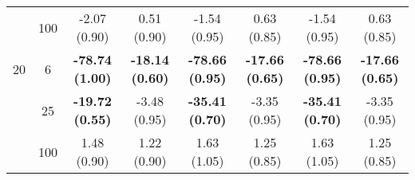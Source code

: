 \documentclass[
  man]{apa6}
\newenvironment{lltable}{\begin{landscape}\centering\begin{ThreePartTable}}{\end{ThreePartTable}\end{landscape}}
\begin{document}
\begin{lltable}
{\begin{longtable}{cccccccc}
 & 100 & -2.07 (0.90) & 0.51 (0.90) & -1.54 (0.95) & 0.63 (0.85) & -1.54 (0.95) & 0.63 (0.85)\\
20 & 6 & \textbf{-78.74 (1.00)} & \textbf{-18.14 (0.60)} & \textbf{-78.66 (0.95)} & \textbf{-17.66 (0.65)} & \textbf{-78.66 (0.95)} & \textbf{-17.66 (0.65)}\\
 & 25 & \textbf{-19.72 (0.55)} & -3.48 (0.95) & \textbf{-35.41 (0.70)} & -3.35 (0.95) & \textbf{-35.41 (0.70)} & -3.35 (0.95)\\
 & 100 & 1.48 (0.90) & 1.22 (0.90) & 1.63 (1.05) & 1.25 (0.85) & 1.63 (1.05) & 1.25 (0.85)\\
\bottomrule
\end{longtable}

}

\end{lltable}
\end{document}
